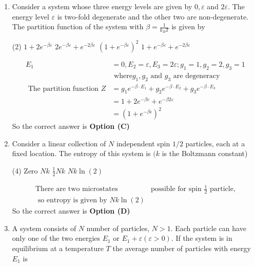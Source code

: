 \begin{enumerate}
	\item Consider a system whose three energy levels are given by $0, \varepsilon$ and $2 \varepsilon$. The energy level $\varepsilon$ is two-fold degenerate and the other two are non-degenerate. The partition function of the system with $\beta=\frac{1}{k_{B} T}$ is given by
\begin{tasks}(2)
\task[\textbf{A.}] $1+2 e^{-\beta \varepsilon}$
\task[\textbf{B.}] $2 e^{-\beta \varepsilon}+e^{-2 \beta \varepsilon}$
\task[\textbf{C.}] $\left(1+e^{-\beta \varepsilon}\right)^{2}$
\task[\textbf{D.}] $1+e^{-\beta \varepsilon}+e^{-2 \beta \varepsilon}$
\end{tasks}
\begin{answer}
$$\begin{aligned}	
E_{1}&=0, E_{2}=\varepsilon, E_{3}=2 \varepsilon ; g_{1}=1, g_{2}=2, g_{3}=1\\&\text{ where} g_{1}, g_{2}\text{ and }g_{3}\text{ are degeneracy}\\
\text{	The partition function }Z&=g_{1} e^{-\beta \cdot E_{1}}+g_{2} e^{-\beta \cdot E_{2}}+g_{3} e^{-\beta \cdot E_{3}}\\&=1+2 e^{-\beta c}+e^{-\beta 2 \varepsilon}\\&=\left(1+e^{-\beta \epsilon}\right)^{2}
\end{aligned}$$	
So the correct answer is \textbf{Option (C)}
\end{answer}
	\item Consider a linear collection of $N$ independent spin $1 / 2$ particles, each at a fixed location. The entropy of this system is $(k$ is the Boltzmann constant)
\begin{tasks}(4)
\task[\textbf{A.}] Zero
\task[\textbf{B.}]  $N k$
\task[\textbf{C.}]  $\frac{1}{2} N k$
\task[\textbf{D.}] $N k \ln (2)$
\end{tasks}
\begin{answer}
$$	\begin{aligned}
\text{There are two microstates }&\text{possible for spin $\frac{1}{2}$ particle,}\\ 
\text{ so entropy is given by $N k \ln (2)$}&
\end{aligned}$$
So the correct answer is \textbf{Option (D)}
\end{answer}
\item A system consists of $N$ number of particles, $N>1 .$ Each particle can have only one of the two energies $E_{1}$ or $E_{1}+\varepsilon(\varepsilon>0) .$ If the system is in equilibrium at a temperature $T$ the average number of particles with energy $E_{1}$ is

\end{enumerate}
